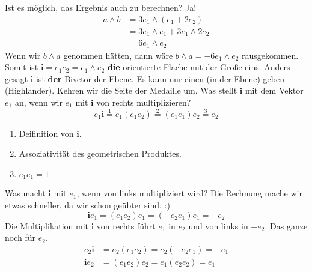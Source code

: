 \documentclass[fleqn]{scrartcl}
\numberwithin{equation}{section}
\def\*#1{\mathbf{#1}}
\begin{document}
Ist es möglich, das Ergebnis auch zu berechnen? Ja!
\begin{align*}
    a\wedge b &= 3e_1\wedge(e_1+2e_2) \\
    &= 3e_1\wedge e_1 + 3e_1\wedge 2e_2 \\
    &=6 e_1\wedge e_2
\end{align*}
Wenn wir $b\wedge a$ genommen hätten, dann wäre $b\wedge a = -6e_1\wedge e_2$
rausgekommen. Somit ist $\*i=e_1e_2=e_1\wedge e_2$ \textbf{die} orientierte
Fläche mit der Größe eins. Anders gesagt $\*i$ ist \textbf{der} Bivetor der
Ebene. Es kann nur einen (in der Ebene) geben (Highlander).
\newpage
Kehren wir die Seite der Medaille um. Was stellt $\*i$ mit dem Vektor $e_1$
an, wenn wir $e_1$ mit $\*i$ von rechts multiplizieren?
\[e_1\*i\stackrel{1}=e_1(e_1e_2)\stackrel{2}=(e_1e_1)e_2\stackrel{3}=e_2\]
\begin{enumerate}
    \item Deifinition von $\*i$.
    \item Assoziativität des geometrischen Produktes.
    \item $e_1e_1=1$
\end{enumerate}
Was macht $\*i$ mit $e_1$, wenn von links multipliziert wird? Die Rechnung
mache wir etwas schneller, da wir schon geübter sind. :)
\[\*ie_1=(e_1e_2)e_1=(-e_2e_1)e_1=-e_2\]
Die Multiplikation mit $\*i$ von rechts führt $e_1$ in $e_2$ und von links in
$-e_2$. Das ganze noch für $e_2$.
\begin{align*}
    e_2\*i &= e_2(e_1e_2) = e_2(-e_2e_1) = -e_1 \\
    \*ie_2 &= (e_1e_2)e_2 = e_1(e_2e_2) = e_1
\end{align*}
\end{document}
